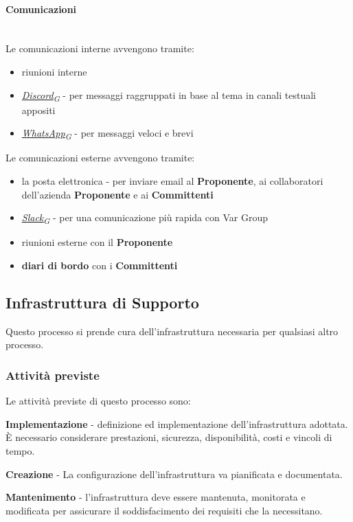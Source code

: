 \documentclass[12pt, a4paper]{article}
\newcommand{\urlglossario}{https://skynetunigroup.github.io/Code_Guardian/Documentazione/PB/glossario_v2.0.0.pdf} %
\newcommand{\glo}[2]{\href{\urlglossario\#nameddest=#2}{#1\textsubscript{G}}}
\begin{document}
\paragraph{Comunicazioni}\mbox{}\\
Le comunicazioni interne avvengono tramite:

\begin{itemize}
\item
  riunioni interne
\item
  \textit{\glo{Discord}{discord}} - per messaggi raggruppati in base al tema in canali testuali appositi
\item
  \textit{\glo{WhatsApp}{whatsapp}} - per messaggi veloci e brevi
\end{itemize}

Le comunicazioni esterne avvengono tramite:

\begin{itemize}
\item
  la posta elettronica - per inviare email al \textbf{Proponente}, ai collaboratori dell'azienda \textbf{Proponente} e ai \textbf{Committenti}
\item
  \textit{\glo{Slack}{slack}} - per una comunicazione più rapida con Var Group
\item
  riunioni esterne con il \textbf{Proponente}
\item
  \textbf{diari di bordo} con i \textbf{Committenti}
\end{itemize}


\subsection{Infrastruttura di Supporto}

Questo processo si prende cura dell'infrastruttura necessaria per qualsiasi altro processo.

\subsubsection{Attività previste}

Le attività previste di questo processo sono:

\textbf{Implementazione} - definizione ed implementazione dell'infrastruttura adottata. È necessario considerare prestazioni, sicurezza, disponibilità, costi e vincoli di tempo.

\textbf{Creazione} - La configurazione dell'infrastruttura va pianificata e documentata.

 \textbf{Mantenimento} - l'infrastruttura deve essere mantenuta, monitorata e modificata per assicurare il soddisfacimento dei requisiti che la necessitano.
\end{document}
